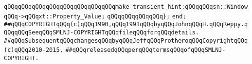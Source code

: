 \verb|qQQqqQQqqQQqqQQqqQQqqQQqqQQqqQQqmake_transient_hint:qQQqqQQqsn::WindowqQQq->qQQqxt::Property_Value;|\newline
\verb|qQQqqQQqqQQqqQQq};|\newline
\newline
\verb|end;|\newline
\newline
\newline
\newline
\newline
\newline
\newline
\newline
\verb|##qQQqCOPYRIGHTqQQq(c)qQQq1990,qQQq1991qQQqbyqQQqJohnqQQqH.qQQqReppy.qQQqqQQqSeeqQQqSMLNJ-COPYRIGHTqQQqfileqQQqforqQQqdetails.|\newline
\verb|##qQQqSubsequentqQQqchangesqQQqbyqQQqJeffqQQqProtheroqQQqCopyrightqQQq(c)qQQq2010-2015,|\newline
\verb|##qQQqreleasedqQQqperqQQqtermsqQQqofqQQqSMLNJ-COPYRIGHT.|\newline

